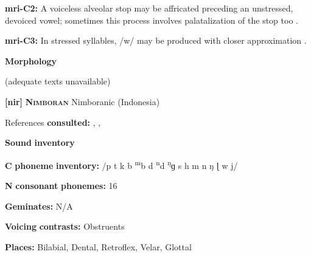 \begin{styleBody}
\textbf{mri-C2:} A voiceless alveolar stop may be affricated preceding an unstressed, devoiced vowel; sometimes this process involves palatalization of the stop too \citep{Bauer1999}.
\end{styleBody}

\begin{styleBody}
\textbf{mri-C3:} In stressed syllables, /w/ may be produced with closer approximation \citep[545]{Bauer1999}.
\end{styleBody}

\begin{styleBody}
\textbf{Morphology}
\end{styleBody}

\begin{styleBody}
(adequate texts unavailable)
\end{styleBody}

\begin{styleBody}
\textbf{[nir]}   \textbf{\textsc{Nimboran}}  Nimboranic (Indonesia)
\end{styleBody}

\begin{styleBody}
References \textbf{consulted:} \citet{Anceaux1965}, \citet{MayMay1981}, \citet{May1997}
\end{styleBody}

\begin{styleBody}
\textbf{Sound} \textbf{inventory}
\end{styleBody}

\begin{styleBody}
\textbf{C} \textbf{phoneme} \textbf{inventory:} /p t k b \textsuperscript{m}b d \textsuperscript{n}d \textsuperscript{ŋ}ɡ s h m n ŋ ɭ w j/
\end{styleBody}

\begin{styleBody}
\textbf{N} \textbf{consonant} \textbf{phonemes:} 16
\end{styleBody}

\begin{styleBody}
\textbf{Geminates:} N/A
\end{styleBody}

\begin{styleBody}
\textbf{Voicing} \textbf{contrasts:} Obstruents
\end{styleBody}

\begin{styleBody}
\textbf{Places:} Bilabial, Dental, Retroflex, Velar, Glottal
\end{styleBody}

